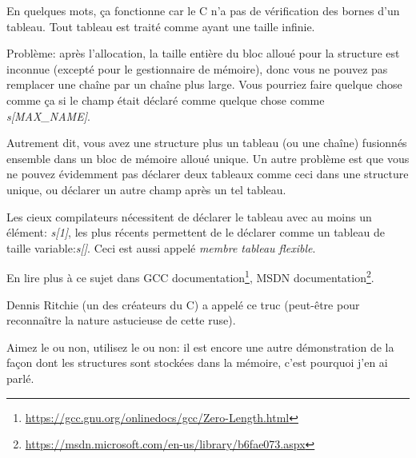 En quelques mots, ça fonctionne car le C n'a pas de vérification des bornes d'un
tableau. Tout tableau est traité comme ayant une taille infinie.

Problème: après l'allocation, la taille entière du bloc alloué pour la structure
est inconnue (excepté pour le gestionnaire de mémoire), donc vous ne pouvez pas remplacer
une chaîne par un chaîne plus large.
Vous pourriez faire quelque chose comme ça si le champ était déclaré comme quelque
chose comme \emph{s[MAX\_NAME]}.

Autrement dit, vous avez une structure plus un tableau (ou une chaîne) fusionnés
ensemble dans un bloc de mémoire alloué unique.
Un autre problème est que vous ne pouvez évidemment pas déclarer deux tableaux comme
ceci dans une structure unique, ou déclarer un autre champ après un tel tableau.

Les cieux compilateurs nécessitent de déclarer le tableau avec au moins un élément:
\emph{s[1]}, les plus récents permettent de le déclarer comme un tableau de taille
variable:\emph{s[]}.
Ceci est aussi appelé \emph{membre tableau flexible}.

En lire plus à ce sujet dans
GCC documentation\footnote{\url{https://gcc.gnu.org/onlinedocs/gcc/Zero-Length.html}},
MSDN documentation\footnote{\url{https://msdn.microsoft.com/en-us/library/b6fae073.aspx}}.

Dennis Ritchie (un des créateurs du C) a appelé ce truc  (peut-être pour reconnaître la nature astucieuse de cette ruse).

Aimez le ou non, utilisez le ou non:
il est encore une autre démonstration de la façon dont les structures sont stockées
dans la mémoire, c'est pourquoi j'en ai parlé.

